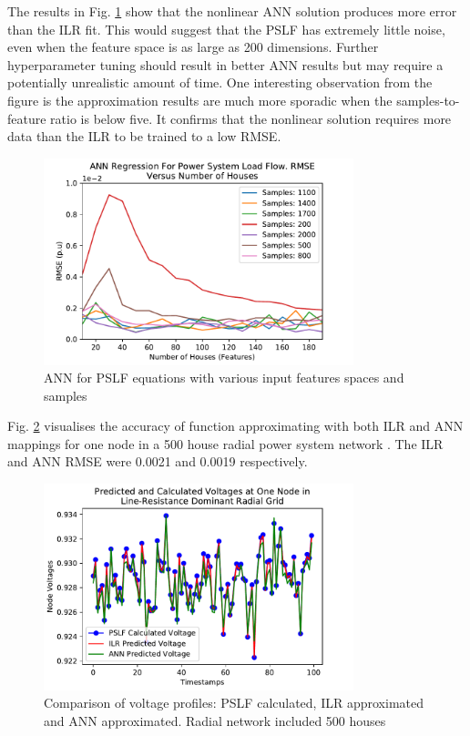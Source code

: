 \documentclass[conference]{IEEEtran}
\begin{document}
The results in Fig. \ref{fig:annresults} show that the nonlinear ANN solution produces more error than the ILR fit. This would suggest that the PSLF has extremely little noise, even when the feature space is as large as 200 dimensions. Further hyperparameter tuning should result in better ANN results but may require a potentially unrealistic amount of time. One interesting observation from the figure is the approximation results are much more sporadic when the samples-to-feature ratio is below five. It confirms that the nonlinear solution requires more data than the ILR to be trained to a low RMSE.

\begin{figure}[h]
	\centering
	\includegraphics[width=9cm]{annrmsevsfeatures_familyofcurves.pdf}
	\caption{ANN for PSLF equations with various input features spaces and samples}
	\label{fig:annresults}
\end{figure}

Fig. \ref{fig:comparison} visualises the accuracy of function approximating with both ILR and ANN mappings for one node in a 500 house radial power system network	. The ILR and ANN RMSE were 0.0021 and 0.0019 respectively.

\begin{figure}[h]
	\centering
	\includegraphics[width=9cm]{comparingvoltages_500.pdf}
	\caption{Comparison of voltage profiles: PSLF calculated, ILR approximated and ANN approximated. Radial network included 500 houses}
	\label{fig:comparison}
\end{figure}
\end{document}
